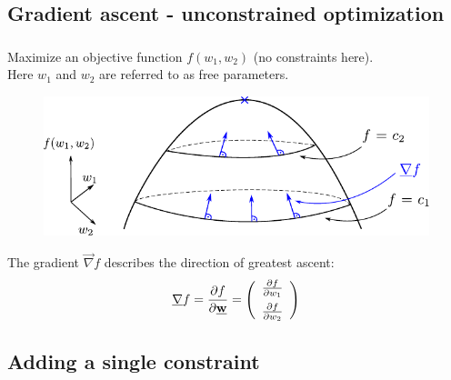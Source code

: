 \subsection{Gradient ascent - unconstrained optimization}
\begin{frame}\frametitle{\subsecname}
Maximize an objective function $f(w_1, w_2)$ (no constraints here).\\
Here $w_1$ and $w_2$ are referred to as free parameters.\\

\begin{figure}[h]
	\centering
	\includegraphics[width=0.8\linewidth]{img/lagrange_objfunction}%
    \label{fig:unconstrained}%
\end{figure}


\slidesonly{
\vspace{-3mm}
}

The gradient $\vec \nabla f$ describes the direction of greatest ascent:\\
\slidesonly{
\vspace{-3mm}
}
\begin{equation}
\underline{\mathbf{\nabla}} f = 
\frac{\partial f}{\partial \underline{\mathbf{w}}} = 
\left( \begin{array}{rrrrrrrrrrrrrrrrrrrrrrrrrr} \frac{\partial f}{\partial w_1} \\[0.2cm] \frac{\partial f}{\partial w_2} \\ \end{array} \right)
\end{equation}

\end{frame}

\subsection{Adding a single constraint}

